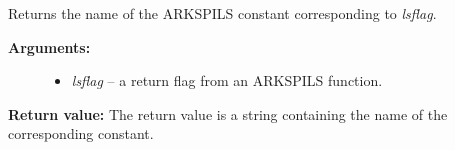 \documentclass[letterpaper,10pt,english]{sphinxmanual}
\begin{document}
\begin{fulllineitems}
\label{c_interface/User_callable:c.ARKSpilsGetReturnFlagName}
Returns the name of the ARKSPILS constant
corresponding to \emph{lsflag}.
\begin{description}
\item[{\textbf{Arguments:}}] \leavevmode\begin{itemize}
\item {} 
\emph{lsflag} -- a return flag from an ARKSPILS function.

\end{itemize}

\end{description}

\textbf{Return value:}
The return value is a string containing the name of
the corresponding constant.

\end{fulllineitems}

\end{document}

